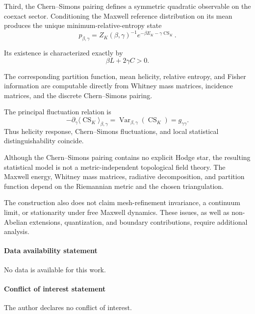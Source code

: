 \documentclass[11pt]{article}
\theoremstyle{definition}
\theoremstyle{remark}
\newcommand{\CS}{\operatorname{CS}}
\newcommand{\Var}{\operatorname{Var}}
\begin{document}
Third, the Chern--Simons pairing defines a symmetric
quadratic observable on the coexact sector. Conditioning the
Maxwell reference distribution on its mean produces the
unique minimum-relative-entropy state
\begin{equation}
p_{\beta,\gamma}
=
Z_K(\beta,\gamma)^{-1}
e^{-\beta E_K-\gamma\CS_K}.
\end{equation}

Its existence is characterized exactly by
\begin{equation}
\beta L+2\gamma C>0.
\end{equation}

The corresponding partition function, mean helicity,
relative entropy, and Fisher information are computable
directly from Whitney mass matrices, incidence matrices, and
the discrete Chern--Simons pairing.

The principal fluctuation relation is
\begin{equation}
\boxed{
-\partial_\gamma
\langle\CS_K\rangle_{\beta,\gamma}
=
\Var_{\beta,\gamma}(\CS_K)
=
g_{\gamma\gamma}.
}
\label{eq:final}
\end{equation}
Thus helicity response, Chern--Simons fluctuations, and local
statistical distinguishability coincide.

Although the Chern--Simons pairing contains no explicit
Hodge star, the resulting statistical model is not a
metric-independent topological field theory. The Maxwell
energy, Whitney mass matrices, radiative decomposition, and
partition function depend on the Riemannian metric and the
chosen triangulation.

The construction also does not claim mesh-refinement
invariance, a continuum limit, or stationarity under free
Maxwell dynamics. These issues, as well as non-Abelian
extensions, quantization, and boundary contributions, require
additional analysis.
\vskip 12pt



\paragraph{\bf Data availability statement} No data is available for this work.

\vskip 12pt

\paragraph{\bf Conflict of interest statement} The author declares no conflict of interest.
\end{document}
